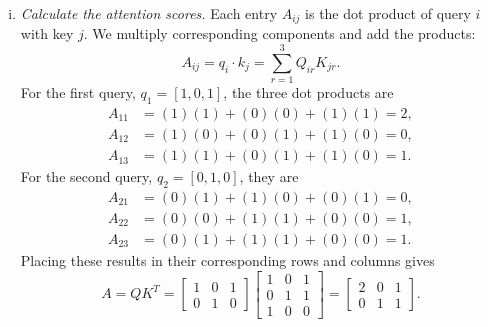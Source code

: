\documentclass[12pt]{article}
\begin{document}
\begin{enumerate}
\begin{enumerate}[a)]
        \begin{enumerate}[(i)]
            \item \emph{Calculate the attention scores.}
            Each entry $A_{ij}$ is the dot product of query $i$ with key $j$.
            We multiply corresponding components and add the products:
            \[
                A_{ij}=q_i\cdot k_j=\sum_{r=1}^{3}Q_{ir}K_{jr}.
            \]
            For the first query, $q_1=[1,0,1]$, the three dot products are
            \[
                \begin{aligned}
                    A_{11}&=(1)(1)+(0)(0)+(1)(1)=2,\\
                    A_{12}&=(1)(0)+(0)(1)+(1)(0)=0,\\
                    A_{13}&=(1)(1)+(0)(1)+(1)(0)=1.
                \end{aligned}
            \]
            For the second query, $q_2=[0,1,0]$, they are
            \[
                \begin{aligned}
                    A_{21}&=(0)(1)+(1)(0)+(0)(1)=0,\\
                    A_{22}&=(0)(0)+(1)(1)+(0)(0)=1,\\
                    A_{23}&=(0)(1)+(1)(1)+(0)(0)=1.
                \end{aligned}
            \]
            Placing these results in their corresponding rows and columns gives
            \[
                A=QK^T
                =\begin{bmatrix}1&0&1\\0&1&0\end{bmatrix}
                 \begin{bmatrix}1&0&1\\0&1&1\\1&0&0\end{bmatrix}
                =\boxed{\begin{bmatrix}2&0&1\\0&1&1\end{bmatrix}}.
            \]


\end{enumerate}
\end{enumerate}
\end{enumerate}
\end{document}

